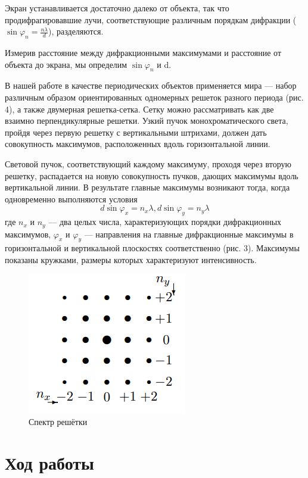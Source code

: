 \documentclass[a4paper,12pt]{article}
\begin{document}
Экран устанавливается достаточно далеко от объекта, так что продифрагировавшие лучи, соответствующие различным порядкам дифракции ($\sin \varphi_n = \frac{n\lambda}{d}$), разделяются. 

Измерив расстояние между дифракционными максимумами и расстояние от объекта до экрана, мы определим $\sin \varphi_n$ и d.

В нашей работе в качестве периодических объектов применяется мира — набор различным образом ориентированных одномерных решеток разного периода (рис. 4), а
также двумерная решетка-сетка. Сетку можно рассматривать как две взаимно перпендикулярные решетки. Узкий пучок монохроматического света, пройдя через первую решетку с вертикальными штрихами, должен дать совокупность максимумов, расположенных вдоль горизонтальной линии.

Световой пучок, соответствующий каждому максимуму, проходя через вторую решетку, распадается на новую совокупность пучков, дающих максимумы вдоль вертикальной линии. В результате главные максимумы возникают тогда, когда одновременно выполняются условия
\begin{equation}
d \sin \varphi_x = n_x \lambda, d \sin \varphi_y = n_y \lambda 
\end{equation}
где $n_x$ и $n_y$ — два целых числа, характеризующих порядки дифракционных максимумов, $\varphi_x$ и $\varphi_y$ — направления на главные дифракционные максимумы в горизонтальной и вертикальной плоскостях соответственно (рис. 3). Максимумы показаны кружками, размеры которых характеризуют интенсивность.
\begin{figure}[H]
	\centering
	\includegraphics[scale=1]{scheme3.png}
	\caption{Спектр решётки}
\end{figure}
\section{Ход работы}
\end{document}
